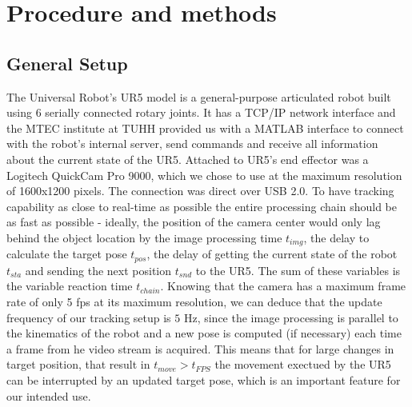 \documentclass[letterpaper, 10 pt, conference]{IEEEconf}  %
\begin{document}

\section{Procedure and methods}

\subsection{General Setup}
The Universal Robot's UR5 model is a general-purpose articulated robot built using 6 serially connected rotary joints. It has a TCP/IP network interface and the MTEC institute at TUHH provided us with a MATLAB interface to connect with the robot's internal server, send commands and receive all information about the current state of the UR5. Attached to UR5's end effector was a Logitech QuickCam Pro 9000, which we chose to use at the maximum resolution of 1600x1200 pixels. The connection was direct over USB 2.0. 
To have tracking capability as close to real-time as possible the entire processing chain should be as fast as possible - ideally, the position of the camera center would only lag behind the object location by the image processing time $t_{img}$, the delay to calculate the target pose $t_{pos}$, the delay of getting the current state of the robot $t_{sta}$ and sending the next position $t_{snd}$ to the UR5. The sum of these variables is the variable reaction time $t_{chain}$. Knowing that the camera has a maximum frame rate of only 5 fps at its maximum resolution, we can deduce that the update frequency of our tracking setup is $5 $ Hz, since the image processing is parallel to the kinematics of the robot and a new pose is computed (if necessary) each time a frame from he video stream is acquired. This means that for large changes in target position, that result in $t_{move} > t_{FPS} $ the movement exectued by the UR5 can be interrupted by an updated target pose, which is an important feature for our intended use. %
\end{document}

